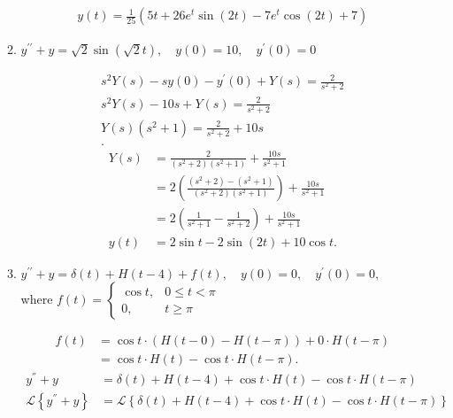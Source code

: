 \documentclass{zc-ust-hw}
\renewcommand{\L}[1]{\mathscr{L}\left\{#1\right\}}
\begin{document}
\begin{enumerate}
\begin{enumerate}
\begin{sol}
\begin{gather}
              y(t) = \frac{1}{25} (5t + 26e^t \sin(2t) - 7e^t \cos(2t) + 7)
            \end{gather}
          \end{sol}
        \item $y^{\prime \prime}+y=\sqrt{2} \sin (\sqrt{2} t), \quad y(0)=10, \quad y^{\prime}(0)=0$
          \begin{sol}
            \begin{gather}
              s^2 Y(s)-sy(0)-y^{\prime}(0)+Y(s) = \frac{2}{s^2+2} \\
              s^2 Y(s)-10s+Y(s) = \frac{2}{s^2+2} \\
              Y(s)(s^2+1) = \frac{2}{s^2+2}+10s \\
            .\end{gather}
            \begin{align}
              Y(s) &= \frac{2}{(s^2+2)(s^2+1)}+\frac{10s}{s^2+1} \\
              &= 2 \left( \frac{(s^2+2)-(s^2+1)}{(s^2+2)(s^2+1)} \right)+\frac{10s}{s^2+1} \\
              &= 2 \left( \frac{1}{s^2+1}-\frac{1}{s^2+2} \right)+\frac{10s}{s^2+1} \\
              y(t)&= 2\sin t-2\sin (2t)+10\cos t
            .\end{align}
          \end{sol}
          \newpage
        \item $y^{\prime \prime}+y=\delta(t)+H(t-4)+f(t), \quad y(0)=0, \quad y^{\prime}(0)=0,$
          \\where $f(t)=
            \begin{cases}
              \cos t, & 0 \leq t<\pi  \\
              0, & t \geq \pi 
            \end{cases}$
            \begin{sol}
              \begin{align}
                f(t) &= \cos t \cdot (H(t-0)-H(t-\pi)) + 0 \cdot H(t-\pi) \\
                &= \cos t \cdot H(t) - \cos t \cdot H(t-\pi)
              .\end{align}
              \begin{align}
                y^{''}+y&=\delta(t)+H(t-4)+\cos t \cdot H(t) - \cos t \cdot H(t-\pi) \\
                \L{y^{''}+y} &= \L{\delta(t)+H(t-4)+\cos t \cdot H(t) - \cos t \cdot H(t-\pi)} \\

\end{align}
\end{sol}
\end{enumerate}
\end{enumerate}
\end{document}
